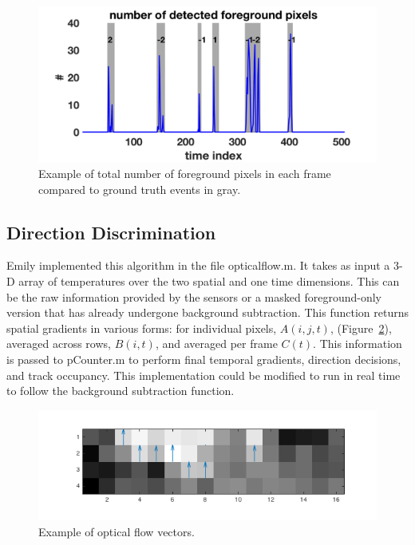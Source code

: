 \documentclass[12pt,oneside]{article} %
\begin{document}
\begin{figure}[!htb]  %
\centering
\includegraphics[scale=0.45]{images/abs_example.png}
\caption{Example of total number of foreground pixels in each frame compared to 
ground truth events in gray.}
\label{abs_example}
\end{figure}


\subsection{Direction Discrimination}
Emily implemented this algorithm in the file opticalflow.m. It takes as input a 3-D array of temperatures over the two spatial and one time dimensions. This can be the raw information provided by the sensors or a masked foreground-only version that has already undergone background subtraction. This function returns spatial gradients in various forms: for individual pixels, $A(i,j,t)$, (Figure~\ref{opflw}), averaged across rows, $B(i,t)$, and averaged per frame $C(t)$. This information is passed to pCounter.m to perform final temporal gradients, direction decisions, and track occupancy. This implementation could be modified to run in real time to follow the background subtraction function.
\begin{figure}[htb]
\centering
\includegraphics[scale=0.52]{images/quiver_gradients.png}
\caption{Example of optical flow vectors.}
\label{opflw}
\end{figure}
\end{document}
